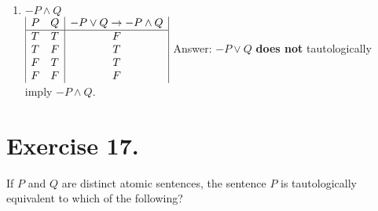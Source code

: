 \documentclass{article}
\begin{document}
\begin{enumerate}[label=(\alph*)]
\item \(-P \land Q\)\\
\(
\begin{array}{|c c|c|}
P & Q & -P \lor Q \rightarrow -P \land Q\\ 
\hline
T & T & F\\
T & F & T\\
F & T & T\\
F & F & F\\
\end{array}
\)
\singlespace
Answer: \(-P \lor Q\) \textbf{does not} tautologically imply \(-P \land Q\).\\
\medskip

\end{enumerate}

\section*{Exercise 17.}
If \(P\) and \(Q\) are distinct atomic sentences, the sentence \(P\) is tautologically equivalent to which of the following?
\end{document}
